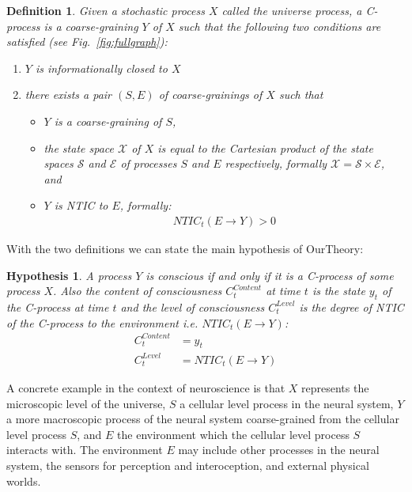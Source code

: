 \documentclass[utf8]{article}
\newtheorem{definition}{Definition}
\newtheorem*{hypothesis}{Hypothesis}
\begin{document}
        \begin{definition}
        Given a stochastic process $X$ called the universe process, a \emph{C-process} is a coarse-graining $Y$ of $X$ such that the following two conditions are satisfied (see Fig.~\ref{fig:fullgraph}):
        \begin{enumerate}
        \item $Y$ is informationally closed to $X$
        \item there exists a pair $(S,E)$ of coarse-grainings of $X$ such that 
        \begin{itemize}
            \item $Y$ is a coarse-graining of $S$,
            \item the state space $\mathcal{X}$ of $X$ is equal to the Cartesian product of the state spaces $\mathcal{S}$ and $\mathcal{E}$ of processes $S$ and $E$ respectively, formally $\mathcal{X}=\mathcal{S}\times\mathcal{E}$, and 
            \item $Y$ is NTIC to $E$, formally:
        \begin{align}
            NTIC_t(E\rightarrow Y) >0
        \end{align}
        \end{itemize} 
        \end{enumerate}
       \end{definition}

        
        
        With the two definitions we can state the main hypothesis of \ac{OurTheory}:
        
        \begin{hypothesis}
        A process $Y$ is conscious if and only if it is a C-process of some process $X$. Also the content of consciousness $C_t^{Content}$ at time $t$ is the state $y_t$ of the C-process at time $t$ and the level of consciousness $C_t^{Level}$ is the degree of NTIC of the C-process to the environment i.e. $NTIC_t(E\rightarrow Y)$:
        \begin{align}
            C_t^{Content} &= y_t \label{eq:cContent}\\
            C_t^{Level} &= NTIC_t(E\rightarrow Y) \label{eq:cLevel}
        \end{align}
        \end{hypothesis}
        
        A concrete example in the context of neuroscience is that $X$ represents the microscopic level of the universe, $S$ a cellular level process in the neural system, $Y$ a more macroscopic process of the neural system coarse-grained from the cellular level process $S$, and $E$ the environment which the cellular level process $S$ interacts with. The environment $E$ may include other processes in the neural system, the sensors for perception and interoception, and external physical worlds.\\
        
\end{document}
